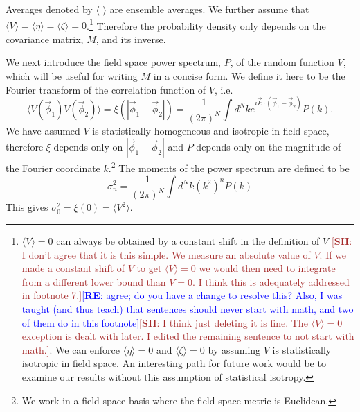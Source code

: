 \documentclass[12pt]{article}
\newcommand{\re}[1]{\textcolor{blue}{[{\bf RE}: #1]}}
\newcommand{\SH}[1]{\textcolor{brown}{[{\bf SH}: #1]}}
\begin{document}
Averages denoted by $\langle \,\,\rangle$ are ensemble averages. We further assume that $\langle V\rangle = \langle \eta\rangle = \langle \zeta\rangle = 0$.\footnote{$\langle V\rangle=0$ can always be obtained by a constant shift in the definition of $V$ \SH{I don't agree that it is this simple. We measure an absolute value of $V$. If we made a constant shift of $V$ to get $\langle V \rangle = 0$ we would then need to integrate from a different lower bound than $V=0$. I think this is adequately addressed in footnote 7.}\re{agree; do you have a change to resolve this? Also, I was taught (and thus teach) that sentences should never start with math, and two of them do in this footnote}\SH{I think just deleting it is fine. The $\langle V\rangle=0$ exception is dealt with later. I edited the remaining sentence to not start with math.}. We can enforce $\langle \eta \rangle = 0$ and $\langle \zeta\rangle = 0$ by assuming $V$ is statistically isotropic in field space. An interesting path for future work would be to examine our results without this assumption of statistical isotropy.} Therefore the probability density only depends on the covariance matrix, $M$, and its inverse.

We next introduce the field space power spectrum, $P$, of the random function $V$, which will be useful for writing $M$ in a concise form. We define it here to be the Fourier transform of the correlation function of $V$, i.e.
%
\begin{equation}\label{powspec}
\langle V(\vec{\phi}_1) V(\vec{\phi}_2) \rangle = \xi(|\vec{\phi}_1-\vec{\phi}_2|)= \frac{1}{(2\pi)^N} \int d^Nk e^{i \vec{k} \cdot (\vec{\phi}_1-\vec{\phi}_2)} P(k).
\end{equation}
%
We have assumed $V$ is statistically homogeneous and isotropic in field space, therefore $\xi$ depends only on $|\vec{\phi}_1-\vec{\phi}_2|$ and  $P$ depends only on the magnitude of the Fourier coordinate $k$.\footnote{We work in a field space basis where the field space metric is Euclidean.} The moments of the power spectrum are defined to be
%
\begin{equation} \label{moments}
\sigma_n^2 = \frac{1}{(2\pi)^N}\int d^Nk (k^{2})^n P(k)
\end{equation}
%
This gives $\sigma_0^2=\xi(0)=\langle V^2 \rangle$.
\end{document}
